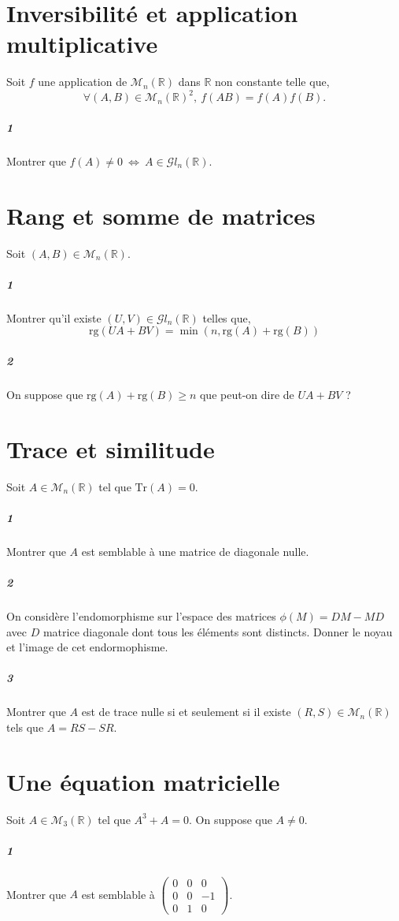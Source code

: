 \documentclass[10pt,a4paper]{article}
\begin{document}
\section{Inversibilité et application multiplicative}
Soit $f$ une application de $\mathcal{M}_n \left( \mathbb{R} \right)$ dans $\mathbb{R}$ non constante telle que,
\begin{equation}
\forall (A,B) \in \mathcal{M}_n \left( \mathbb{R} \right)^2, \ f(AB) = f(A) f(B).
\end{equation}
\subparagraph{1}Montrer que $f(A) \neq 0 \ \Leftrightarrow \ A \in \mathcal{G}l_n \left( \mathbb{R} \right)$. 

\section{Rang et somme de matrices}
Soit $(A,B) \in \mathcal{M}_n \left( \mathbb{R} \right)$.
\subparagraph{1}Montrer qu'il existe $(U,V) \in \mathcal{G}l_n \left( \mathbb{R} \right)$ telles que,
\begin{equation}
\text{rg}(UA + BV) = \min(n, \text{rg}(A)+ \text{rg}(B))
\end{equation} 
\subparagraph{2}On suppose que $\text{rg}(A)+ \text{rg}(B) \ge n$ que peut-on dire de $UA+BV$ ?

\section{Trace et similitude}
Soit $A \in \mathcal{M}_n \left( \mathbb{R} \right)$ tel que $\text{Tr}(A) = 0$.
\subparagraph{1}Montrer que $A$ est semblable à une matrice de diagonale nulle.
\subparagraph{2}On considère l'endomorphisme sur l'espace des matrices $\phi(M) = DM-MD$ avec $D$ matrice diagonale dont tous les éléments sont distincts. Donner le noyau et l'image de cet endormophisme.
\subparagraph{3}
Montrer que $A$ est de trace nulle si et seulement si il existe $(R,S) \in \mathcal{M}_n \left( \mathbb{R} \right)$ tels que $A = RS -SR$.
\section{Une équation matricielle}
Soit $A \in \mathcal{M}_3 \left( \mathbb{R} \right)$ tel que $A^3+A = 0$. On suppose que $A \neq 0$.
\subparagraph{1}Montrer que $A$ est semblable à $\left( \begin{matrix}
0 & 0 & 0 \\ 
0 & 0 & -1 \\
0 & 1 & 0
\end{matrix} \right)$.
\end{document}
